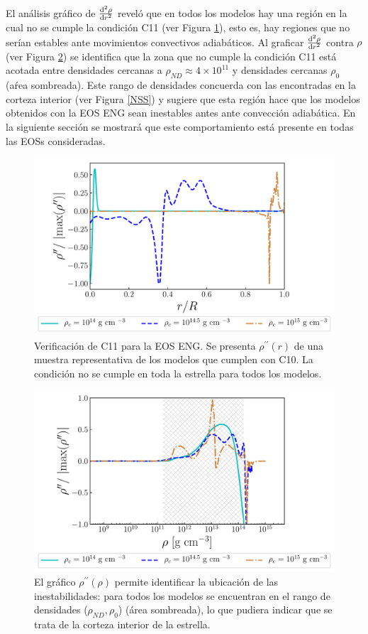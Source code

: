 El análisis gráfico de $\dv[2]{\rho}{r}$ reveló que en todos los modelos hay una región en la cual no se cumple la condición C11 (ver Figura \ref{ConvecStabilityeng}), esto es, hay regiones que no serían estables ante movimientos convectivos adiabáticos. Al graficar $\dv[2]{\rho}{r}$ contra $\rho$ (ver Figura \ref{ConvecStabilityengCorrel}) se identifica que la zona que no cumple la condición C11 está acotada entre densidades cercanas a $\rho_{ND}\approx 4 \times 10^{11} $ y densidades cercanas $\rho_0$ (aŕea sombreada). Este rango de densidades concuerda con las encontradas en la corteza interior (ver Figura \ref{NSS}) y sugiere que esta región hace que los modelos obtenidos con la EOS ENG sean inestables antes ante convección adiabática. En la siguiente sección se mostrará que este comportamiento está presente en todas las EOSs consideradas.
\begin{figure}%
    \centering
    \includegraphics[width=0.8\linewidth]{figures/ConvecStabilityeng.pdf}
    \caption[Verificación de C11 para la EOS ENG]{Verificación de C11 para la EOS ENG. Se presenta $\rho^{\prime\prime}(r)$ de una muestra representativa de los modelos que cumplen con C10. La condición no se cumple en toda la estrella para todos los modelos. }
    \label{ConvecStabilityeng}
\end{figure}
\begin{figure}[H]
    \centering
    \includegraphics[width=0.8\linewidth]{figures/ConvecStabilityengCorrel.pdf}
    \caption[Correlación entre la inestabilidad y la corteza interior usando el diagrama $\rho^{\prime\prime}$ vs $\rho$]{El gráfico $\rho^{\prime\prime}(\rho)$ permite identificar la ubicación de las inestabilidades: para todos los modelos se encuentran en el rango de densidades ($\rho_{ND},\rho_0$) (área sombreada), lo que pudiera indicar que se trata de la corteza interior de la estrella.} 
    \label{ConvecStabilityengCorrel}
\end{figure}


